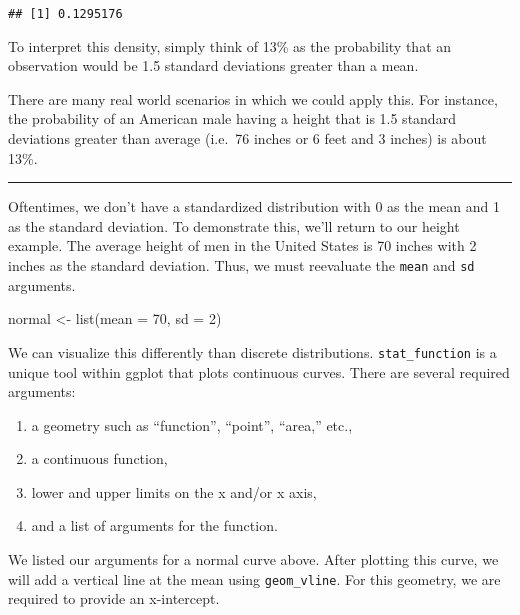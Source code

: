 \documentclass[
]{article}
\newenvironment{Shaded}{\begin{snugshade}}{\end{snugshade}}
\newcommand{\AttributeTok}[1]{\textcolor[rgb]{0.77,0.63,0.00}{#1}}
\newcommand{\DecValTok}[1]{\textcolor[rgb]{0.00,0.00,0.81}{#1}}
\newcommand{\FunctionTok}[1]{\textcolor[rgb]{0.00,0.00,0.00}{#1}}
\newcommand{\NormalTok}[1]{#1}
\newcommand{\OtherTok}[1]{\textcolor[rgb]{0.56,0.35,0.01}{#1}}
\providecommand{\tightlist}{%
  \setlength{\itemsep}{0pt}\setlength{\parskip}{0pt}}
\begin{document}
\begin{verbatim}
## [1] 0.1295176
\end{verbatim}

To interpret this density, simply think of 13\% as the probability that an observation would be 1.5 standard deviations greater than a mean.

There are many real world scenarios in which we could apply this. For instance, the probability of an American male having a height that is 1.5 standard deviations greater than average (i.e.~76 inches or 6 feet and 3 inches) is about 13\%.

\begin{center}\rule{0.5\linewidth}{0.5pt}\end{center}

Oftentimes, we don't have a standardized distribution with 0 as the mean and 1 as the standard deviation. To demonstrate this, we'll return to our height example. The average height of men in the United States is 70 inches with 2 inches as the standard deviation. Thus, we must reevaluate the \texttt{mean} and \texttt{sd} arguments.

\begin{Shaded}
\begin{Highlighting}[]
\NormalTok{normal }\OtherTok{\textless{}{-}} \FunctionTok{list}\NormalTok{(}\AttributeTok{mean =} \DecValTok{70}\NormalTok{, }\AttributeTok{sd =} \DecValTok{2}\NormalTok{)}
\end{Highlighting}
\end{Shaded}

We can visualize this differently than discrete distributions. \texttt{stat\_function} is a unique tool within ggplot that plots continuous curves. There are several required arguments:

\begin{enumerate}
\def\labelenumi{\arabic{enumi}.}
\tightlist
\item
  a geometry such as ``function'', ``point'', ``area,'' etc.,
\item
  a continuous function,
\item
  lower and upper limits on the x and/or x axis,
\item
  and a list of arguments for the function.
\end{enumerate}

We listed our arguments for a normal curve above. After plotting this curve, we will add a vertical line at the mean using \texttt{geom\_vline}. For this geometry, we are required to provide an x-intercept.
\end{document}
